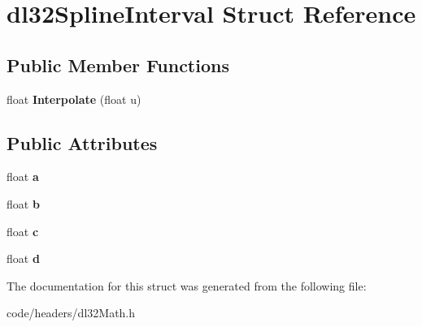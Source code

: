 \hypertarget{structdl32_spline_interval}{\section{dl32\-Spline\-Interval Struct Reference}
\label{structdl32_spline_interval}
}
\subsection*{Public Member Functions}
\begin{DoxyCompactItemize}
\item 
\hypertarget{structdl32_spline_interval_ad491453c6c779d1caf56b41372247258}{float {\bfseries Interpolate} (float u)}\label{structdl32_spline_interval_ad491453c6c779d1caf56b41372247258}

\end{DoxyCompactItemize}
\subsection*{Public Attributes}
\begin{DoxyCompactItemize}
\item 
\hypertarget{structdl32_spline_interval_a236e57fc3737dc78d60066e401a82386}{float {\bfseries a}}\label{structdl32_spline_interval_a236e57fc3737dc78d60066e401a82386}

\item 
\hypertarget{structdl32_spline_interval_a4ffa2068a86f7757797c97dd18e054fa}{float {\bfseries b}}\label{structdl32_spline_interval_a4ffa2068a86f7757797c97dd18e054fa}

\item 
\hypertarget{structdl32_spline_interval_a29fea3cca6f7f7f51835881fedc8c713}{float {\bfseries c}}\label{structdl32_spline_interval_a29fea3cca6f7f7f51835881fedc8c713}

\item 
\hypertarget{structdl32_spline_interval_af3203893fb7cc9ebba666c58bd8eabc9}{float {\bfseries d}}\label{structdl32_spline_interval_af3203893fb7cc9ebba666c58bd8eabc9}

\end{DoxyCompactItemize}


The documentation for this struct was generated from the following file\-:\begin{DoxyCompactItemize}
\item 
code/headers/dl32\-Math.\-h\end{DoxyCompactItemize}
